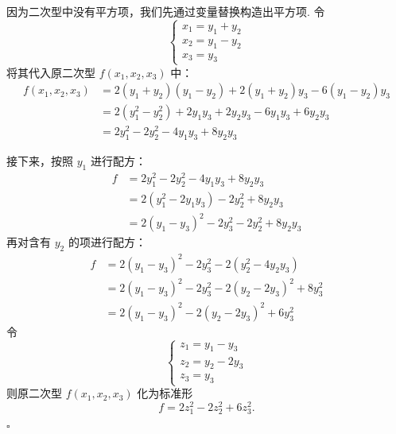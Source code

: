 \documentclass[UTF8]{book}
\newenvironment{solution}{{\noindent\it Solution.} }{\hfill $\square$\par}
\begin{document}
\begin{solution}
    因为二次型中没有平方项，我们先通过变量替换构造出平方项. 令
$$\begin{cases}
x_1 = y_1 + y_2\\
x_2 = y_1 - y_2\\
x_3 = y_3
\end{cases}$$
将其代入原二次型 \(f(x_1,x_2,x_3)\) 中：
\begin{align*}
    f(x_1,x_2,x_3)&=2(y_1 + y_2)(y_1 - y_2)+2(y_1 + y_2)y_3-6(y_1 - y_2)y_3\\
    &=2(y_1^2 - y_2^2)+2y_1y_3 + 2y_2y_3-6y_1y_3 + 6y_2y_3\\
    &=2y_1^2-2y_2^2 - 4y_1y_3+8y_2y_3
    \end{align*}
    
    接下来，按照 \(y_1\) 进行配方：
    \begin{align*}
    f&=2y_1^2-2y_2^2 - 4y_1y_3+8y_2y_3\\
    &=2(y_1^2 - 2y_1y_3)-2y_2^2+8y_2y_3\\
    &=2(y_1 - y_3)^2-2y_3^2-2y_2^2+8y_2y_3
    \end{align*}
    再对含有 \(y_2\) 的项进行配方：
    \begin{align*}
    f&=2(y_1 - y_3)^2-2y_3^2-2(y_2^2 - 4y_2y_3)\\
    &=2(y_1 - y_3)^2-2y_3^2-2(y_2 - 2y_3)^2+8y_3^2\\
    &=2(y_1 - y_3)^2-2(y_2 - 2y_3)^2 + 6y_3^2
    \end{align*}
    令
    $$\begin{cases}
    z_1 = y_1 - y_3\\
    z_2 = y_2 - 2y_3\\
    z_3 = y_3
    \end{cases}$$
    则原二次型 \(f(x_1,x_2,x_3)\) 化为标准形 
    $$f = 2z_1^2-2z_2^2 + 6z_3^2.$$


\end{solution}
\end{document}
